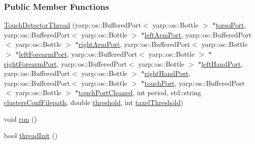 \subsubsection*{Public Member Functions}
\begin{DoxyCompactItemize}
\item 
\hyperlink{group__touchDetector_a5c835c3a119e45a9a7c1853b11d50775}{Touch\+Detector\+Thread} (yarp\+::os\+::\+Buffered\+Port$<$ yarp\+::os\+::\+Bottle $>$ $\ast$\hyperlink{group__touchDetector_a40c56d22bab1fdb6876c5ff7ea06e9e8}{torso\+Port}, yarp\+::os\+::\+Buffered\+Port$<$ yarp\+::os\+::\+Bottle $>$ $\ast$\hyperlink{group__touchDetector_a975fc42c10d903e8006cb49800bf9589}{left\+Arm\+Port}, yarp\+::os\+::\+Buffered\+Port$<$ yarp\+::os\+::\+Bottle $>$ $\ast$\hyperlink{group__touchDetector_a8522b0d27f973b9a8c8b2e10c656f9b3}{right\+Arm\+Port}, yarp\+::os\+::\+Buffered\+Port$<$ yarp\+::os\+::\+Bottle $>$ $\ast$\hyperlink{group__touchDetector_ac34d0d0c972146971c59c9150b2fcbc4}{left\+Forearm\+Port}, yarp\+::os\+::\+Buffered\+Port$<$ yarp\+::os\+::\+Bottle $>$ $\ast$\hyperlink{group__touchDetector_a905ee0fe0ed60104b941d044386856a5}{right\+Forearm\+Port}, yarp\+::os\+::\+Buffered\+Port$<$ yarp\+::os\+::\+Bottle $>$ $\ast$\hyperlink{group__touchDetector_a6b373d5f8e235c68ce5526909c44074f}{left\+Hand\+Port}, yarp\+::os\+::\+Buffered\+Port$<$ yarp\+::os\+::\+Bottle $>$ $\ast$\hyperlink{group__touchDetector_af6585ff213a437baa0b232304f0f9a68}{right\+Hand\+Port}, yarp\+::os\+::\+Buffered\+Port$<$ yarp\+::os\+::\+Bottle $>$ $\ast$\hyperlink{group__touchDetector_aba1732a9b24e61da4ad3ed1650a214ea}{touch\+Port}, yarp\+::os\+::\+Buffered\+Port$<$ yarp\+::os\+::\+Bottle $>$ $\ast$\hyperlink{group__touchDetector_aefc680e659906e2a9b7e870d8ea837be}{touch\+Port\+Cleaned}, int period, std\+::string \hyperlink{group__touchDetector_af4ffe4e72ec3978af45f63f5f1721ff0}{clusters\+Conf\+Filepath}, double \hyperlink{group__touchDetector_a876e80882e9772d72a1062f1bd67aca6}{threshold}, int \hyperlink{group__touchDetector_a2d699150315f222848ecf5e2d2a345f7}{taxel\+Threshold})
\item 
void \hyperlink{group__touchDetector_a82ba0ba5951f718245a271e2a7689703}{run} ()
\item 
bool \hyperlink{group__touchDetector_ae3198aedd09c06b63b68f98fe58cc382}{thread\+Init} ()
\end{DoxyCompactItemize}
